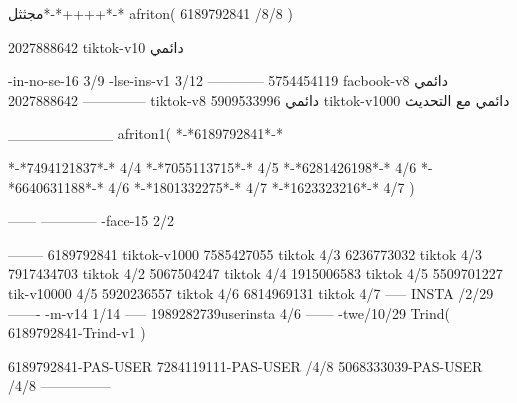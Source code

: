 مجثثل*-*++++*-*
afriton(
6189792841 /8/8
)

2027888642 tiktok-v10
دائمي

-in-no-se-16 3/9
-lse-ins-v1 3/12
------------
5754454119 facbook-v8
دائمي
--------------
2027888642 tiktok-v8
دائمي
5909533996 tiktok-v1000
دائمي مع التحديث

__________
afriton1(
*-*6189792841*-*

*-*7494121837*-* 4/4
*-*7055113715*-* 4/5
*-*6281426198*-* 4/6
*-*6640631188*-* 4/6
*-*1801332275*-* 4/7
*-*1623323216*-* 4/7
)


------
------------
-face-15 2/2

--------
6189792841 tiktok-v1000
7585427055 tiktok 4/3
6236773032 tiktok 4/3
7917434703 tiktok 4/2
5067504247 tiktok 4/4
1915006583 tiktok 4/5
5509701227 tik-v10000 4/5
5920236557 tiktok 4/6
6814969131 tiktok 4/7
-----
 INSTA /2/29
-------
-m-v14 1/14
-----
1989282739userinsta 4/6
------
-twe/10/29
Trind(
6189792841-Trind-v1 
)

6189792841-PAS-USER
7284119111-PAS-USER /4/8
5068333039-PAS-USER /4/8
    ---------------
